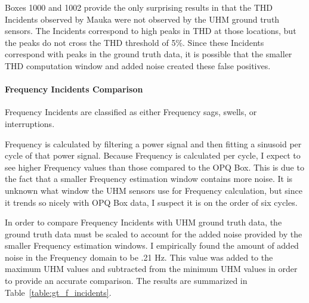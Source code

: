 Boxes 1000 and 1002 provide the only surprising results in that the THD Incidents observed by Mauka were not observed by the UHM ground truth sensors. The Incidents correspond to high peaks in THD at those locations, but the peaks do not cross the THD threshold of 5\%. Since these Incidents correspond with peaks in the ground truth data, it is possible that the smaller THD computation window and added noise created these false positives.

\paragraph{Frequency Incidents Comparison}

Frequency Incidents are classified as either Frequency sags, swells, or interruptions.

Frequency is calculated by filtering a power signal and then fitting a sinusoid per cycle of that power signal. Because Frequency is calculated per cycle, I expect to see higher Frequency values than those compared to the OPQ Box. This is due to the fact that a smaller Frequency estimation window contains more noise. It is unknown what window the UHM sensors use for Frequency calculation, but since it trends so nicely with OPQ Box data, I suspect it is on the order of six cycles.

In order to compare Frequency Incidents with UHM ground truth data, the ground truth data must be scaled to account for the added noise provided by the smaller Frequency estimation windows. I empirically found the amount of added noise in the Frequency domain to be .21 Hz. This value was added to the maximum UHM values and subtracted from the minimum UHM values in order to provide an accurate comparison. The results are summarized in Table~\ref{table:gt_f_incidents}.

